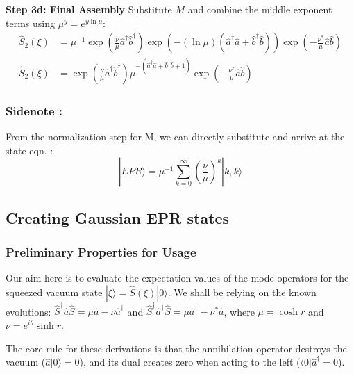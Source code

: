\textbf{Step 3d: Final Assembly}
Substitute $M$ and combine the middle exponent terms using $\mu^y = e^{y\ln\mu}$:
\begin{align}
\hat{S}_2(\xi) &= \mu^{-1} \exp\left(\frac{\nu}{\mu}\hat{a}^\dagger\hat{b}^\dagger\right) \exp\left(-(\ln\mu)(\hat{a}^\dagger\hat{a} + \hat{b}^\dagger\hat{b})\right) \exp\left(-\frac{\nu^*}{\mu}\hat{a}\hat{b}\right) \\
\hat{S}_2(\xi) &= \exp\left(\frac{\nu}{\mu}\hat{a}^\dagger\hat{b}^\dagger\right) \mu^{-(\hat{a}^\dagger\hat{a} + \hat{b}^\dagger\hat{b} + 1)} \exp\left(-\frac{\nu^*}{\mu}\hat{a}\hat{b}\right)
\end{align}

\subsubsection{Sidenote :}

From the normalization step for M, we can directly substitute and arrive at the state eqn. : 
\begin{equation}
|EPR\rangle= \mu^{-1} \sum_{k=0}^{\infty} \left(\frac{\nu}{\mu}\right)^k |k,k\rangle
\end{equation}

\newpage
\subsection{Creating Gaussian EPR states}

\subsubsection{Preliminary Properties for Usage}

Our aim here is to evaluate the expectation values of the mode operators for the squeezed vacuum state $|\xi\rangle = \hat{S}(\xi)|0\rangle$. We shall be relying on the known evolutions: $\hat{S}^\dagger \hat{a} \hat{S} = \mu\hat{a} - \nu\hat{a}^\dagger$ and $\hat{S}^\dagger \hat{a}^\dagger \hat{S} = \mu\hat{a}^\dagger - \nu^*\hat{a}$, where $\mu = \cosh r$ and $\nu = e^{i\theta}\sinh r$. 

The core rule for these derivations is that the annihilation operator destroys the vacuum ($\hat{a}|0\rangle = 0$), and its dual creates zero when acting to the left ($\langle 0|\hat{a}^\dagger = 0$).

